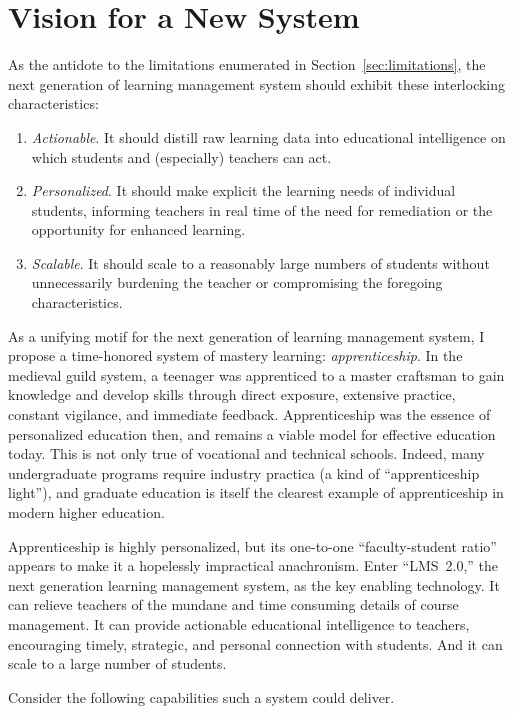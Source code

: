 \documentclass{article}
\begin{document}
\section{Vision for a New System}
\label{sec:vision}

As the antidote to the
limitations enumerated in Section~\ref{sec:limitations},
the next generation of learning management system
should exhibit these interlocking characteristics:
\begin{enumerate}
\item \emph{Actionable}.
  It should distill raw learning data
  into educational intelligence
  on which students and (especially) teachers can act.
\item \emph{Personalized}.
  It should make explicit
  the learning needs of individual students,
  informing teachers in real time
  of the need for remediation
  or the opportunity for enhanced learning.
\item \emph{Scalable}.
  It should scale
  to a reasonably large numbers of students
  without unnecessarily burdening the teacher
  or compromising the foregoing characteristics.
\end{enumerate}

As a unifying motif
for the next generation of learning management system,
I propose a time-honored system of mastery learning: \emph{apprenticeship}.
In the medieval guild system,
a teenager was apprenticed to a master craftsman
to gain knowledge and develop skills
through direct exposure, extensive practice,
constant vigilance, and immediate feedback.
Apprenticeship was the essence of personalized education then,
and remains a viable model for effective education today.
This is not only true of vocational and technical schools.
Indeed, many undergraduate programs
require industry practica (a kind of ``apprenticeship light''),
and graduate education is itself
the clearest example of apprenticeship
in modern higher education.

Apprenticeship is highly personalized,
but its one-to-one ``faculty-student ratio''
appears to make it a hopelessly impractical anachronism.
Enter ``LMS~2.0,''
the next generation learning management system,
as the key enabling technology.
It can relieve teachers
of the mundane and time consuming details of course management.
It can provide actionable educational intelligence to teachers,
encouraging timely, strategic, and personal connection with students.
And it can scale to a large number of students.

Consider the following capabilities such a system could deliver.
\end{document}
